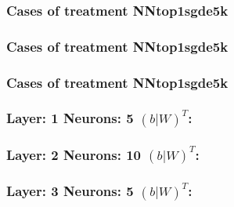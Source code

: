 \documentclass[18pt,c]{beamer}
\begin{document}
 \begin{frame}
 \fontsize{8pt}{9pt}\selectfont
 \frametitle{ Cases of treatment NNtop1sgde5k }

 \label{ExpDSolutionTable025.tex}  
 \end{frame}

 \begin{frame}
 \fontsize{8pt}{9pt}\selectfont
 \frametitle{ Cases of treatment NNtop1sgde5k }

 \label{ExpDSolutionTable026.tex}  
 \end{frame}

 \begin{frame}
 \fontsize{8pt}{9pt}\selectfont
 \frametitle{ Cases of treatment NNtop1sgde5k }

 \label{ExpDSolutionTable027.tex}  
 \end{frame}


 \begin{frame}
 \fontsize{8pt}{9pt}\selectfont
 \frametitle{ Layer: 1 Neurons: 5  $(b|W)^T$: 
 }

 \label{ExpDNNWeightTable024.tex}  
 \end{frame}


 \begin{frame}
 \fontsize{8pt}{9pt}\selectfont
 \frametitle{ Layer: 2 Neurons: 10  $(b|W)^T$: 
 }

 \label{ExpDNNWeightTable025.tex}  
 \end{frame}


 \begin{frame}
 \fontsize{8pt}{9pt}\selectfont
 \frametitle{ Layer: 3 Neurons: 5  $(b|W)^T$: 
 }

 \label{ExpDNNWeightTable026.tex}  
 \end{frame}
\end{document}
